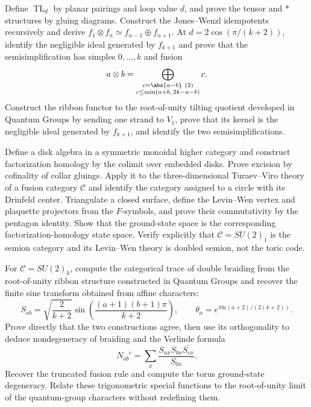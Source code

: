 \begin{exercise}
Define $\operatorname{TL}_d$ by planar pairings and loop value $d$, and prove
the tensor and $*$ structures by gluing diagrams.  Construct the Jones--Wenzl
idempotents recursively and derive
$f_1\otimes f_n\simeq f_{n-1}\oplus f_{n+1}$.  At
$d=2\cos(\pi/(k+2))$, identify the negligible ideal generated by $f_{k+1}$
and prove that the semisimplification has simples $0,\ldots,k$ and fusion
\[
 a\otimes b=\bigoplus_{\substack{c=\abs{a-b}\ (2)\\
 c\le\min(a+b,\,2k-a-b)}}c.
\]
Construct the ribbon functor to the root-of-unity tilting quotient developed
in Quantum Groups by sending one strand to $V_1$, prove that its kernel is the
negligible ideal generated by $f_{k+1}$, and identify the two
semisimplifications.
\end{exercise}

\begin{exercise}
Define a disk algebra in a symmetric monoidal higher category and construct
factorization homology by the colimit over embedded disks.  Prove excision by
cofinality of collar gluings.  Apply it to the three-dimensional
Turaev--Viro theory of a fusion category $\mathcal C$ and identify the category
assigned to a circle with its Drinfeld center.  Triangulate a closed surface,
define the Levin--Wen vertex and plaquette projectors from the $F$-symbols,
and prove their commutativity by the pentagon identity.  Show that the
ground-state space is the corresponding factorization-homology state space.
Verify explicitly that $\mathcal C=SU(2)_1$ is the semion category and its
Levin--Wen theory is doubled semion, not the toric code.
\end{exercise}

\begin{exercise}
For $\mathcal C=SU(2)_k$, compute the categorical trace of double braiding
from the root-of-unity ribbon structure constructed in Quantum Groups and
recover the finite sine transform
obtained from affine characters:
\[
 S_{ab}=\sqrt{\frac{2}{k+2}}
 \sin\!\left(\frac{(a+1)(b+1)\pi}{k+2}\right),
 \qquad
 \theta_a=e^{\pi\ii a(a+2)/(2(k+2))}.
\]
Prove directly that the two constructions agree, then use its orthogonality
to deduce nondegeneracy of braiding and the Verlinde formula
\[
 N_{ab}^{\phantom{ab}c}=\sum_x
 \frac{S_{ax}S_{bx}\overline{S_{cx}}}{S_{0x}}.
\]
Recover the truncated fusion rule and compute the torus ground-state
degeneracy.  Relate these trigonometric special functions to the root-of-unity
limit of the quantum-group characters without redefining them.
\end{exercise}

